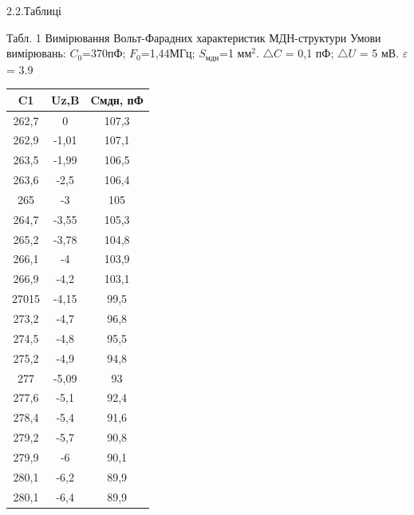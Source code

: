 \documentclass[a4paper,14pt]{extreport}
\begin{document}
\clearpage
\begin{center}2.2.Таблиці\\ \end{center}
	\begin{minipage}{0.9\textwidth}
	\begin{center}
	Табл. 1 Вимірювання Вольт-Фарадних характеристик МДН-структури
	Умови вимірювань: $C_0$=370пФ; $F_0$=1,44МГц; $S_{\text{мдн}}$=1 мм$^2$. $\triangle C$ = 0,1 пФ; $\triangle U$ = 5 мВ. $\varepsilon$ = 3.9
	\end{center}
		\begin{minipage}{0.4\textwidth}
			\begin{tabular}{|c|c|c|}
			\hline
			C1    & Uz,B   & Cмдн, пФ \\ \hline
			262,7 & 0      & 107,3    \\ \hline
			262,9 & -1,01 & 107,1    \\ \hline
			263,5 & -1,99 & 106,5    \\ \hline
			263,6 & -2,5   & 106,4    \\ \hline
			265   & -3     & 105      \\ \hline
			264,7 & -3,55  & 105,3    \\ \hline
			265,2 & -3,78  & 104,8    \\ \hline
			266,1 & -4     & 103,9    \\ \hline
			266,9 & -4,2   & 103,1    \\ \hline
			27015 & -4,15   & 99,5      \\ \hline
			273,2 & -4,7   & 96,8     \\ \hline
			274,5 & -4,8   & 95,5     \\ \hline
			275,2 & -4,9   & 94,8     \\ \hline
			277   & -5,09  & 93       \\ \hline
			277,6 & -5,1  & 92,4     \\ \hline
			278,4 & -5,4  & 91,6     \\ \hline
			279,2 & -5,7   & 90,8     \\ \hline
			279,9 & -6     & 90,1     \\ \hline
			280,1 & -6,2   & 89,9     \\ \hline
			280,1 & -6,4   & 89,9     \\ \hline
			\end{tabular}
		\end{minipage}
		\hfill
		\begin{minipage}{0.4\textwidth}
			\begin{tabular}{|l|l|l|}

\end{tabular}
\end{minipage}
\end{minipage}
\end{document}
